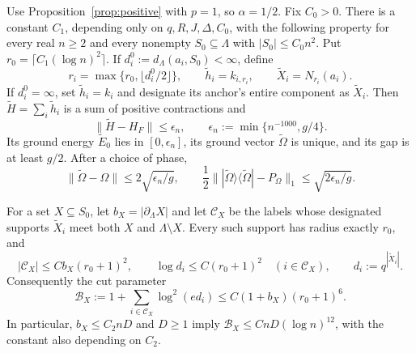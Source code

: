 \begin{proposition}
\label{prop:truncation}
Use Proposition~\ref{prop:positive} with $p=1$, so $\alpha=1/2$.
Fix $C_0>0$.  There is a constant $C_1$, depending only on
$q,R,J,\Delta,C_0$, with the following property for every real $n\ge2$
and every nonempty $S_0\subseteq\Lambda$ with $|S_0|\le C_0n^2$.
Put $r_0=\lceil C_1(\log n)^2\rceil$.  If
$d_i^0:=d_\Lambda(a_i,S_0)<\infty$, define
\begin{equation}
 r_i=\max\{r_0,\lfloor d_i^0/2\rfloor\},\qquad
 \widetilde h_i=k_{i,r_i},\qquad \widetilde X_i=N_{r_i}(a_i).
 \label{eq:quasilocal-variable-radius}
\end{equation}
If $d_i^0=\infty$, set $\widetilde h_i=k_i$ and designate its anchor's
entire component as $\widetilde X_i$.  Then
$\widetilde H=\sum_i\widetilde h_i$ is a sum of positive contractions and
\begin{equation}
 \|\widetilde H-H_F\|\le\epsilon_n,
 \qquad \epsilon_n:=\min\{n^{-1000},g/4\}.
 \label{eq:quasilocal-truncation-error}
\end{equation}
Its ground energy $\widetilde E_0$ lies in $[0,\epsilon_n]$, its ground
vector $\widetilde\Omega$ is unique, and its gap is at least $g/2$.
After a choice of phase,
\begin{equation}
 \|\widetilde\Omega-\Omega\|\le2\sqrt{\epsilon_n/g},\qquad
 \frac12\big\||\widetilde\Omega\rangle\langle\widetilde\Omega|
                 -P_\Omega\big\|_1\le\sqrt{2\epsilon_n/g}.
 \label{eq:quasilocal-ground-distance}
\end{equation}

For a set $X\subseteq S_0$, let $b_X=|\partial_\Lambda X|$ and let
$\mathcal C_X$ be the labels whose designated supports
$\widetilde X_i$ meet both $X$ and $\Lambda\setminus X$.
Every such support has radius exactly $r_0$, and
\begin{equation}
 |\mathcal C_X|\le Cb_X(r_0+1)^2,\qquad
 \log d_i\le C(r_0+1)^2\quad(i\in\mathcal C_X),\qquad
 d_i:=q^{|\widetilde X_i|}.
 \label{eq:quasilocal-crossing-count}
\end{equation}
Consequently the cut parameter
\begin{equation}
 \mathcal B_X:=1+\sum_{i\in\mathcal C_X}\log^2(e d_i)
       \le C(1+b_X)(r_0+1)^6.
 \label{eq:quasilocal-cut-budget}
\end{equation}
In particular, $b_X\le C_2nD$ and $D\ge1$ imply
$\mathcal B_X\le CnD(\log n)^{12}$, with the constant also depending
on $C_2$.
\end{proposition}

